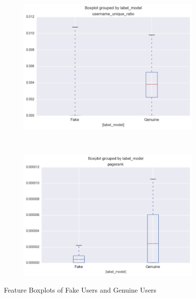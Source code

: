 \documentclass[a4paper, 12pt]{report}
\begin{document}
\begin{figure}[H]
\begin{subfigure}[c]{0.3\linewidth}
		\includegraphics[width =\linewidth]{username_unique_ratio.png}
	\end{subfigure}
	~
	\begin{subfigure}[c]{0.3\linewidth}
	\includegraphics[width =\linewidth]{pagerank.png}
	\end{subfigure}
	\caption{Feature Boxplots of Fake Users and Genuine Users}
	
\end{figure}
\end{document}
